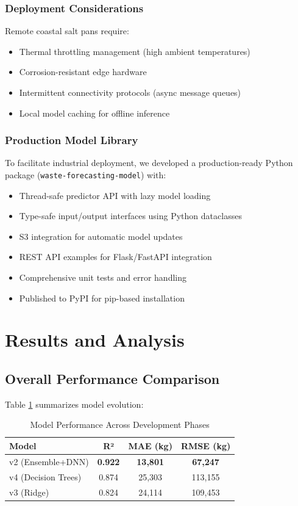 \documentclass[conference]{IEEEtran}
\begin{document}
\subsubsection{Deployment Considerations}
Remote coastal salt pans require:
\begin{itemize}
    \item Thermal throttling management (high ambient temperatures)
    \item Corrosion-resistant edge hardware
    \item Intermittent connectivity protocols (async message queues)
    \item Local model caching for offline inference
\end{itemize}

\subsubsection{Production Model Library}
To facilitate industrial deployment, we developed a production-ready Python package (\texttt{waste-forecasting-model}) with:
\begin{itemize}
    \item Thread-safe predictor API with lazy model loading
    \item Type-safe input/output interfaces using Python dataclasses
    \item S3 integration for automatic model updates
    \item REST API examples for Flask/FastAPI integration
    \item Comprehensive unit tests and error handling
    \item Published to PyPI for pip-based installation
\end{itemize}

\section{Results and Analysis}

\subsection{Overall Performance Comparison}
Table \ref{tab:comparison} summarizes model evolution:

\begin{table}[h]
\centering
\caption{Model Performance Across Development Phases}
\label{tab:comparison}
\begin{tabular}{lccc}
\toprule
\textbf{Model} & \textbf{R²} & \textbf{MAE (kg)} & \textbf{RMSE (kg)} \\
\midrule
v2 (Ensemble+DNN) & \textbf{0.922} & \textbf{13,801} & \textbf{67,247} \\
v4 (Decision Trees) & 0.874 & 25,303 & 113,155 \\
v3 (Ridge) & 0.824 & 24,114 & 109,453 \\
\bottomrule
\end{tabular}
\end{table}
\end{document}
